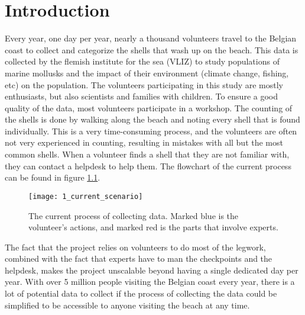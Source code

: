 
\chapter{Introduction}

Every year, one day per year, nearly a thousand volunteers travel to the Belgian coast to collect and categorize the shells that wash up on the beach. This data is collected by the flemish institute for the sea (VLIZ) to study populations of marine mollusks and the impact of their environment (climate change, fishing, etc) on the population. The volunteers participating in this study are mostly enthusiasts, but also scientists and families with children. To ensure a good quality of the data, most volunteers participate in a workshop. The counting of the shells is done by walking along the beach and noting every shell that is found individually. This is a very time-consuming process, and the volunteers are often not very experienced in counting, resulting in mistakes with all but the most common shells. When a volunteer finds a shell that they are not familiar with, they can contact a helpdesk to help them. The flowchart of the current process can be found in figure \ref{fig:1_current_scenario}. 

\begin{figure}[h]
	\centering
	\texttt{[image: 1\_current\_scenario]}
	\caption{\label{fig:1_current_scenario}The current process of collecting data. \newline
	Marked blue is the volunteer's actions, and marked red is the parts that involve experts.}
\end{figure}

The fact that the project relies on volunteers to do most of the legwork, combined with the fact that experts have to man the checkpoints and the helpdesk, makes the project unscalable beyond having a single dedicated day per year. With over 5 million people
visiting the Belgian coast every year, there is a lot of potential data to collect if the process of collecting the data could be simplified to be accessible to anyone visiting the beach at any time.

